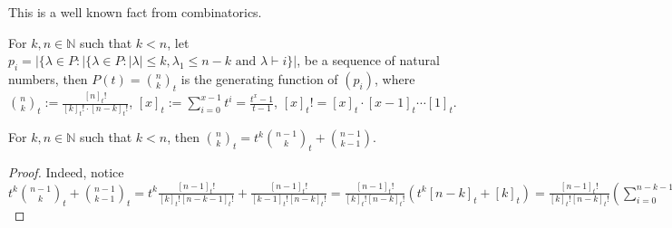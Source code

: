 This is a well known fact from combinatorics.
\begin{proposition}\label{prop:gen_function} For $k,n\in\mathbb{N}$ such that $k<n$, let $p_i=|\{\lambda\in P:|\{\lambda\in P:|\lambda|\leq k,\lambda_1\leq n-k\text{ and }\lambda\vdash i\}|$, be a sequence of natural numbers, then $P(t)=\binom{n}{k}_t$ is the generating function of $(p_i)$, where $\binom{n}{k}_t:=\frac{[n]_t!}{[k]_t!\cdot[n-k]_t!}$, $[x]_t:=\sum_{i=0}^{x-1}t^i=\frac{t^x-1}{t-1}$, $[x]_t!=[x]_t\cdot[x-1]_t\cdots[1]_t$.
\end{proposition}

\begin{lemma}\label{lem:recursive_relation} For $k,n\in\mathbb{N}$ such that $k<n$, then $\binom{n}{k}_t=t^k\binom{n-1}{k}_t+\binom{n-1}{k-1}$.
\end{lemma}
\begin{proof} Indeed, notice  $t^k\binom{n-1}{k}_t+\binom{n-1}{k-1}_t=t^k\frac{[n-1]_t!}{[k]_t![n-k-1]_t!}+\frac{[n-1]_t!}{[k-1]_t![n-k]_t!}=\frac{[n-1]_t!}{[k]_t![n-k]_t!}\left(t^k[n-k]_t+[k]_t\right)=\frac{[n-1]_t!}{[k]_t![n-k]_t!}\left(\sum_{i=0}^{n-k-1}t^{i+k}+\sum_{j=0}^{k-1}t^j\right)=\frac{[n-1]_t!}{[k]_t![n-k]_t!}\sum_{i=0}^{n-1}t^{i+k}=\binom{n}{k}_t$
\end{proof}

